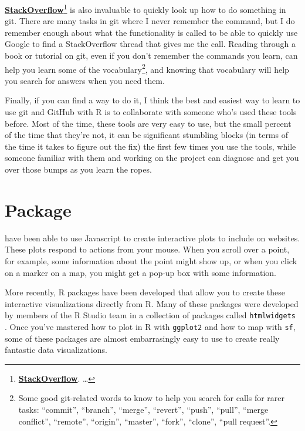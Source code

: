 \documentclass[]{tufte-book}
\begin{document}
\href{https://stackoverflow.com/}{\textbf{StackOverflow}}\footnote{\href{https://stackoverflow.com/}{\textbf{StackOverflow}}.
  \ldots{}}
is also invaluable to quickly look up how to do something in git. There are
many tasks in git where I never remember the command, but I do remember enough about what
the functionality is called to be able to quickly use Google to find a StackOverflow thread
that gives me the call. Reading through a book or tutorial on git, even if you don't
remember the commands you learn, can help you learn some of the vocabulary\footnote{Some good git-related
  words to know to help you search for calls for rarer tasks: ``commit'', ``branch'', ``merge'', ``revert'',
  ``push'', ``pull'', ``merge conflict'', ``remote'', ``origin'', ``master'', ``fork'', ``clone'', ``pull request''.},
and knowing that vocabulary will help you search for answers when you need them.

Finally, if you can find a way to do it, I think the best and easiest way to learn to use git
and GitHub with R is to collaborate with someone who's used these tools before. Most of the
time, these tools are very easy to use, but the small percent of the time that they're not,
it can be significant stumbling blocks (in terms of the time it takes to figure out the fix)
the first few times you use the tools, while someone familiar with them and working on the
project can diagnose and get you over those bumps as you learn the ropes.

\hypertarget{package}{%
\chapter{Package}\label{package}}

 have been able to use Javascript to create
interactive plots to include on
websites. These plots respond to actions from your mouse. When you scroll over a point,
for example, some information about the point might show up, or when you click on a marker
on a map, you might get a pop-up box with some information.

More recently, R packages have been developed that allow you to create these interactive
visualizations directly from R. Many of these packages were developed by members of the
R Studio team in a collection of packages called \texttt{htmlwidgets} \citep{R-htmlwidgets}. Once you've
mastered how to plot in R with \texttt{ggplot2} and how to map with \texttt{sf}, some of these packages
are almost embarrasingly easy to use to create really fantastic data visualizations.
\end{document}
